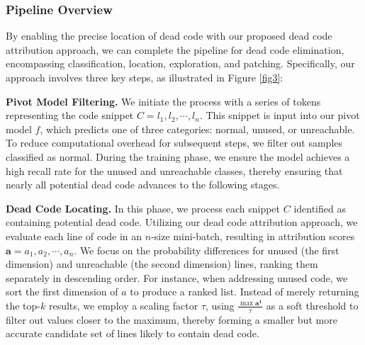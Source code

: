 \documentclass[11pt]{article}
\begin{document}

\subsubsection{Pipeline Overview}
By enabling the precise location of dead code with our proposed dead code attribution approach, we can complete the pipeline for dead code elimination, encompassing classification, location, exploration, and patching. Specifically, our approach involves three key steps, as illustrated in Figure \ref{fig3}:

\textbf{Pivot Model Filtering.} We initiate the process with a series of tokens representing the code snippet $C = {l_1, l_2, \cdots, l_n}$. This snippet is input into our pivot model $f$, which predicts one of three categories: normal, unused, or unreachable. To reduce computational overhead for subsequent steps, we filter out samples classified as normal. During the training phase, we ensure the model achieves a high recall rate for the unused and unreachable classes, thereby ensuring that nearly all potential dead code advances to the following stages.

\textbf{Dead Code Locating.}
In this phase, we process each snippet $C$ identified as containing potential dead code. Utilizing our dead code attribution approach, we evaluate each line of code in an $n$-size mini-batch, resulting in attribution scores $\boldsymbol{a} = {a_1, a_2, \cdots, a_n}$. We focus on the probability differences for unused (the first dimension) and unreachable (the second dimension) lines, ranking them separately in descending order. For instance, when addressing unused code, we sort the first dimension of $a$ to produce a ranked list. Instead of merely returning the top-$k$ results, we employ a scaling factor $\tau$, using $\frac{\max \boldsymbol{a^1}}{\tau}$ as a soft threshold to filter out values closer to the maximum, thereby forming a smaller but more accurate candidate set of lines likely to contain dead code.
\end{document}
